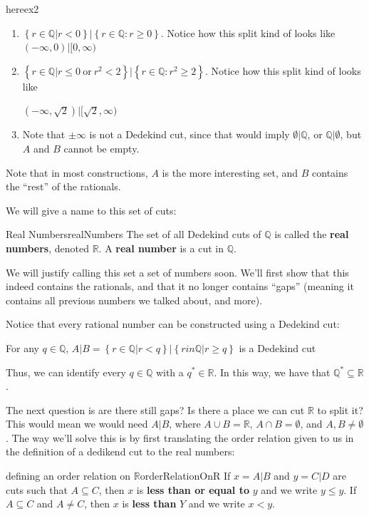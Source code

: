 \documentclass{book}
\newcommand{\Q}{{\mathbb{Q}}}
\newcommand{\R}{{\mathbb{R}}}
\newcommand{\sse}{\subseteq}
\renewcommand{\bf}[1]{\textbf{#1}}
\begin{document}
\begin{example}{here}{ex2}
	\begin{enumerate}
		\item $\left\{ r \in \Q | r < 0 \right\} | \left\{ r \in \Q : r \ge 0 \right\}$. Notice how this split kind of
			looks like $(-\infty, 0) |[0,\infty)$
		\item $\left\{ r \in \Q | r \le 0\ \text{or}\ r^2 < 2\right\} | \left\{ r \in \Q : r^2 \ge 2\right\}$. Notice how this split kind of
			looks like

			$(-\infty, \sqrt{2}) |[\sqrt{2},\infty)$
		\item Note that $\pm \infty$ is not a Dedekind cut, since that would imply $\emptyset|\Q$, or $\Q|\emptyset$,
			but $A$ and $B$ cannot be empty.
	\end{enumerate}
\end{example}

Note that in most constructions, $A$ is the more interesting set, and $B$ contains the ``rest'' of the rationals.

We will give a name to this set of cuts:
\begin{defn}{Real Numbers}{realNumbers}
	The set of all Dedekind cuts of $\Q$ is called the \bf{real numbers}, denoted $\R$. A \bf{real number} is a cut in $\Q$.
\end{defn}

We will justify calling this set a set of numbers soon. We'll first show that this indeed contains the rationals, and
that it no longer contains ``gaps'' (meaning it contains all previous numbers we talked about, and more).

Notice that every rational number can be constructed using a Dedekind cut:
\begin{titledBox}{}
	For any $q \in \Q$, $A|B = \left\{ r \in \Q | r < q \right\}| \left\{ r in \Q | r \ge q \right\}$ is a Dedekind cut
\end{titledBox}

Thus, we can identify every $q \in \Q$ with a $q^* \in \R$. In this way, we have that $\Q^* \sse \R$.

The next question is are there still gaps? Is there a place we can cut $\R$ to split it? This would mean we would need
$A|B$, where $A\cup B = \R$, $A\cap B = \emptyset$, and $A, B \ne \emptyset$. The way we'll solve this is by first
translating the order relation given to us in the definition of a dedikend cut to the real numbers:

\begin{defn}{defining an order relation on $\R$}{orderRelationOnR}
	If $x = A|B$ and $y = C|D$ are cuts such that $A \sse C$, then $x$ is \bf{less than or equal to} $y$ and we write $y
	\le y$. If $A \sse C$ and $A \ne C$, then $x$ is \bf{less than} $Y$ and we write $x < y$.
\end{defn}
\end{document}
